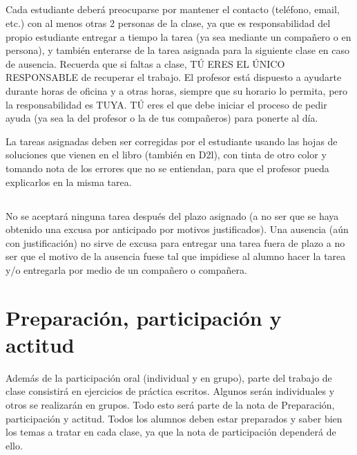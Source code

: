 \documentclass[12pt]{article}
\begin{document}
\subsection{}
\begin{singlespace}
\noindent Cada estudiante deberá preocuparse por mantener el contacto (teléfono, email, etc.) con al menos otras 2 personas de la clase, ya que es responsabilidad del propio estudiante entregar a tiempo la tarea (ya sea mediante un compañero o en persona), y también enterarse de la tarea asignada para la siguiente clase en caso de ausencia. Recuerda que si faltas a clase, TÚ ERES EL ÚNICO RESPONSABLE de recuperar el trabajo. El profesor está dispuesto a ayudarte durante horas de oficina y a otras horas, siempre que su horario lo permita, pero la responsabilidad es TUYA. TÚ eres el que debe iniciar el proceso de pedir ayuda (ya sea la del profesor o la de tus compañeros) para ponerte al día.\\
\begin{bf}
\noindent La tareas asignadas deben ser corregidas por el estudiante usando las hojas de soluciones que vienen en el libro (también en D2l), con tinta de otro color y tomando nota de los errores que no se entiendan, para que el profesor pueda explicarlos en la misma tarea.
\end{bf}
\end{singlespace}

\subsection{}
\begin{singlespace}
\noindent No se aceptará ninguna tarea después del plazo asignado (a no ser que se haya obtenido una excusa por anticipado por motivos justificados). Una ausencia (aún con justificación) no sirve de excusa para entregar una tarea fuera de plazo a no ser que el motivo de la ausencia fuese tal que impidiese al alumno hacer la tarea y/o entregarla por medio de un compañero o compañera.
\end{singlespace}

\section{Preparación, participación y actitud}
\begin{singlespace}
\noindent Además de la participación oral (individual y en grupo), parte del trabajo de clase consistirá en ejercicios de práctica escritos. Algunos serán individuales y otros se realizarán en grupos. Todo esto será parte de la nota de Preparación, participación y actitud. Todos los alumnos deben estar preparados y saber bien los temas a tratar en cada clase, ya que la nota de participación dependerá de ello.
\end{singlespace}
\end{document}
